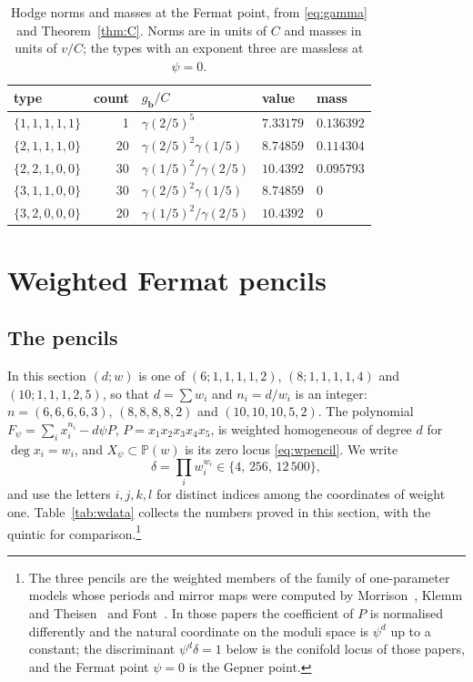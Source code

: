 \documentclass[11pt]{amsart}
\theoremstyle{definition}
\theoremstyle{remark}
\newcommand{\PP}{\mathbb{P}}
\newcommand{\bb}{\mathbf{b}}
\begin{document}
\begin{table}[t]
\caption{Hodge norms and masses at the Fermat point, from
\eqref{eq:gamma} and Theorem~\ref{thm:C}. Norms are in units of $C$ and
masses in units of $v/C$; the types with an exponent three are massless at
$\psi=0$.}
\label{tab:fermat}
\centering
\begin{tabular}{lrlll}
\toprule
type & count & $g_{\bb}/C$ & value & mass\\
\midrule
$\{1,1,1,1,1\}$ & 1 & $\gamma(2/5)^5$ & $7.33179$ & $0.136392$\\
$\{2,1,1,1,0\}$ & 20 & $\gamma(2/5)^2\gamma(1/5)$ & $8.74859$ & $0.114304$\\
$\{2,2,1,0,0\}$ & 30 & $\gamma(1/5)^2/\gamma(2/5)$ & $10.4392$ & $0.095793$\\
$\{3,1,1,0,0\}$ & 30 & $\gamma(2/5)^2\gamma(1/5)$ & $8.74859$ & $0$\\
$\{3,2,0,0,0\}$ & 20 & $\gamma(1/5)^2/\gamma(2/5)$ & $10.4392$ & $0$\\
\bottomrule
\end{tabular}
\end{table}

\section{Weighted Fermat pencils}\label{sec:weighted}

\subsection{The pencils}

In this section $(d;w)$ is one of $(6;1,1,1,1,2)$, $(8;1,1,1,1,4)$ and
$(10;1,1,1,2,5)$, so that $d=\sum w_i$ and $n_i=d/w_i$ is an integer:
$n=(6,6,6,6,3)$, $(8,8,8,8,2)$ and $(10,10,10,5,2)$. The polynomial
$F_\psi=\sum_ix_i^{n_i}-d\psi P$, $P=x_1x_2x_3x_4x_5$, is weighted
homogeneous of degree $d$ for $\deg x_i=w_i$, and $X_\psi\subset\PP(w)$ is
its zero locus \eqref{eq:wpencil}. We write
\[
\delta=\prod_iw_i^{w_i}\in\{4,\,256,\,12\,500\},
\]
and use the letters $i,j,k,l$ for distinct indices among the coordinates of
weight one. Table~\ref{tab:wdata} collects the numbers proved in this
section, with the quintic for comparison.\footnote{The three pencils are the
weighted members of the family of one-parameter models whose periods and
mirror maps were computed by Morrison~\cite{Mor92}, Klemm and
Theisen~\cite{KT93} and Font~\cite{Fon93}. In those papers the coefficient
of $P$ is normalised differently and the natural coordinate on the moduli
space is $\psi^d$ up to a constant; the discriminant $\psi^d\delta=1$ below
is the conifold locus of those papers, and the Fermat point $\psi=0$ is the
Gepner point.}
\end{document}
